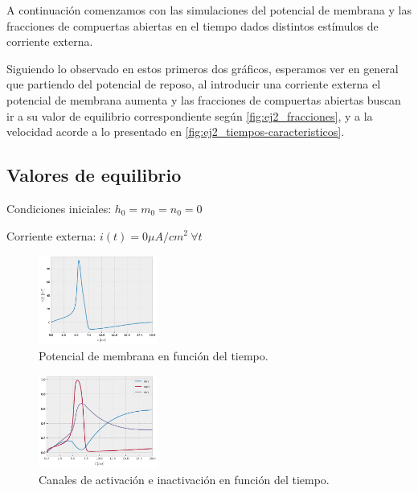 \documentclass[aps,twocolumn,groupedaddress]{revtex4-2}
\begin{document}
A continuación comenzamos con las simulaciones del potencial de membrana y las fracciones de compuertas abiertas en el tiempo dados distintos estímulos de corriente externa.

Siguiendo lo observado en estos primeros dos gráficos, esperamos ver en general que partiendo del potencial de reposo, al introducir una corriente externa el potencial de membrana aumenta y las fracciones de compuertas abiertas buscan ir a su valor de equilibrio correspondiente según \ref{fig:ej2_fracciones}, y a la velocidad acorde a lo presentado en \ref{fig:ej2_tiempos-caracteristicos}.

\subsection{Valores de equilibrio}
Condiciones iniciales: $h_0 = m_0 = n_0 = 0$

Corriente externa: $i(t) = 0\mu A/cm^2 \ \forall t$

\begin{figure}[ht]
    \centering
    \includegraphics[width=0.35\textwidth]{figs/ej3_potencial.png}
    \caption{Potencial de membrana en función del tiempo.} 
    \label{fig:ej3_potencial}
\end{figure}
\begin{figure}[ht]
    \centering
    \includegraphics[width=0.35\textwidth]{figs/ej3_canales.png}
    \caption{Canales de activación e inactivación en función del tiempo.} 
    \label{fig:ej5_canales}
\end{figure}
\end{document}
